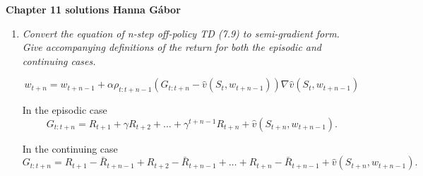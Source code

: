 \documentclass[12pt,a4paper]{article}
\begin{document}
\textbf{Chapter 11 solutions  \hfill Hanna Gábor}

\begin{enumerate}
  \item \textit{Convert the equation of n-step off-policy TD (7.9) to semi-gradient
  form. Give accompanying definitions of the return for both the episodic and
  continuing cases.}

  \[w_{t + n} = w_{t + n - 1} + \alpha \rho_{t : t + n - 1}(G_{t: t + n} - \hat{v}(S_t,
  w_{t + n - 1})) \nabla \hat{v}(S_t, w_{t + n - 1})\]

  In the episodic case
  \[G_{t : t + n} = R_{t + 1} + \gamma R_{t + 2} + \dots + \gamma^{t + n - 1} R_{t + n} +
  \hat{v}(S_{t + n}, w_{t + n - 1}).\]

  In the continuing case
  \[G_{t : t + n} = R_{t + 1} - \bar{R}_{t + n - 1} + R_{t + 2} - \bar{R}_{t + n - 1}
  + \dots + R_{t + n} - \bar{R}_{t + n - 1} + \hat{v}(S_{t + n}, w_{t + n - 1}).\]

\end{enumerate}
\end{document}
